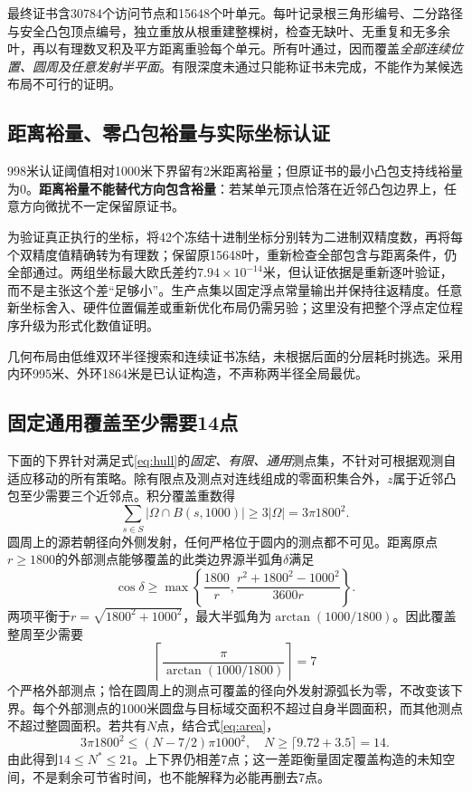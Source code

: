 \documentclass[UTF8,a4paper,zihao=-4,fontset=mac]{ctexart}
\begin{document}
最终证书含30784个访问节点和15648个叶单元。每叶记录根三角形编号、二分路径与安全凸包顶点编号，独立重放从根重建整棵树，检查无缺叶、无重复和无多余叶，再以有理数叉积及平方距离重验每个单元。所有叶通过，因而覆盖\emph{全部连续位置、圆周及任意发射半平面}。有限深度未通过只能称证书未完成，不能作为某候选布局不可行的证明。

\subsection{距离裕量、零凸包裕量与实际坐标认证}
998米认证阈值相对1000米下界留有2米距离裕量；但原证书的最小凸包支持线裕量为0。\textbf{距离裕量不能替代方向包含裕量}：若某单元顶点恰落在近邻凸包边界上，任意方向微扰不一定保留原证书。

为验证真正执行的坐标，将42个冻结十进制坐标分别转为二进制双精度数，再将每个双精度值精确转为有理数；保留原15648叶，重新检查全部包含与距离条件，仍全部通过。两组坐标最大欧氏差约$7.94\times10^{-14}$米，但认证依据是重新逐叶验证，而不是主张这个差“足够小”。生产点集以固定浮点常量输出并保持往返精度。任意新坐标舍入、硬件位置偏差或重新优化布局仍需另验；这里没有把整个浮点定位程序升级为形式化数值证明。

几何布局由低维双环半径搜索和连续证书冻结，未根据后面的分层耗时挑选。采用内环995米、外环1864米是已认证构造，不声称两半径全局最优。

\subsection{固定通用覆盖至少需要14点}
下面的下界针对满足式\eqref{eq:hull}的\emph{固定、有限、通用}测点集，不针对可根据观测自适应移动的所有策略。除有限点及测点对连线组成的零面积集合外，$z$属于近邻凸包至少需要三个近邻点。积分覆盖重数得
\begin{equation}\label{eq:area}
\sum_{s\in S}|\Omega\cap B(s,1000)|\ge3|\Omega|=3\pi1800^2.
\end{equation}
圆周上的源若朝径向外侧发射，任何严格位于圆内的测点都不可见。距离原点$r\ge1800$的外部测点能够覆盖的此类边界源半弧角$\delta$满足
\begin{equation}
\cos\delta\ge\max\left\{\frac{1800}{r},\frac{r^2+1800^2-1000^2}{3600r}\right\}.
\end{equation}
两项平衡于$r=\sqrt{1800^2+1000^2}$，最大半弧角为$\arctan(1000/1800)$。因此覆盖整周至少需要
\begin{equation}
\left\lceil\frac{\pi}{\arctan(1000/1800)}\right\rceil=7
\end{equation}
个严格外部测点；恰在圆周上的测点可覆盖的径向外发射源弧长为零，不改变该下界。每个外部测点的1000米圆盘与目标域交面积不超过自身半圆面积，而其他测点不超过整圆面积。若共有$N$点，结合式\eqref{eq:area}，
\begin{equation}
3\pi1800^2\le(N-7/2)\pi1000^2,
\quad N\ge\lceil9.72+3.5\rceil=14.
\end{equation}
由此得到$14\le N^*\le21$。上下界仍相差7点；这一差距衡量固定覆盖构造的未知空间，不是剩余可节省时间，也不能解释为必能再删去7点。
\end{document}
